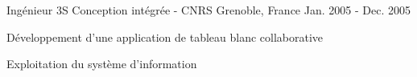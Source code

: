 \begin{cventries}
  \cventry
    {Ingénieur} %
    {3S Conception intégrée - CNRS} %
    {Grenoble, France} %
    {Jan. 2005 - Dec. 2005} %
    {
      \begin{cvitems} %
        \item {Développement d'une application de tableau blanc collaborative}
        \item {Exploitation du système d'information}
      \end{cvitems}
    }

\end{cventries}
